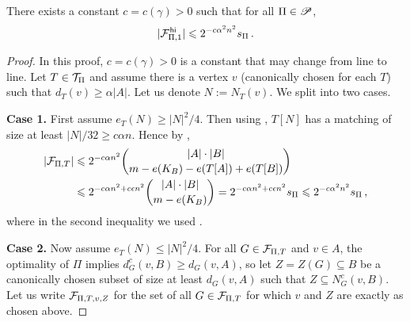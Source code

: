 \begin{lemma}\label{lemma:FPi1}
There exists a constant $c=c(\gamma)>0$ such that for all $\Pi\in{\mathscr P}$,
$$\lvert{\mathcal F}^{\hspace{0.2mm}\mathsf{hi}}_{\Pi,1}\rvert\leqslant2^{-c\alpha^2n^2}s_\Pi\,.$$
\end{lemma}
\begin{proof}
In this proof, $c=c(\gamma)>0$ is a constant that may change from line to line. Let $T\in{\mathcal T}_\Pi$ and assume there is a vertex $v$ (canonically chosen for each $T$) such that $d_T(v)\geq\alpha|A|$. Let us denote $N:=N_T(v)$. We split into two cases.

\smallskip
\noindent\textbf{Case 1.}
First assume $e_T(N)\geq|N|^2/4$. Then using \cite[Lemma~A.3]{perkins2025typical}, $T[N]$ has a matching of size at least $|N|/32\geq c\alpha n$. Hence by ,
\begin{align}
|{\mathcal F}_{\Pi,T}| &\leqslant 2^{-c\alpha n^2}\binom{|A|\cdot|B|}{m-e(K_B)-e(T[A])+e(T[B])} \nonumber\\
&\leqslant 2^{-c\alpha n^2+c\epsilon n^2}\binom{|A|\cdot|B|}{m-e(K_B)}
=2^{-c\alpha n^2+c\epsilon n^2}s_\Pi \leqslant2^{-c\alpha^2n^2}s_\Pi\,, \label{eqn:fhipi1-case1-bd}
\end{align}
where in the second inequality we used \cite[Lemma~A.1(ii)]{perkins2025typical}.
\smallskip

\noindent\textbf{Case 2.} Now assume $e_T(N)\leq|N|^2/4$. For all $G\in{\mathcal F}_{\Pi,T}$ and $v\in A$, the optimality of $\Pi$ implies $d_G^c(v,B)\geq d_G(v,A)$, so let $Z=Z(G)\subseteq B$ be a canonically chosen subset of size at least $d_G(v,A)$ such that $Z\subseteq N^c_G(v,B)$. Let us write ${\mathcal F}_{\Pi,T,v,Z}$ for the set of all $G\in{\mathcal F}_{\Pi,T}$ for which $v$ and $Z$ are exactly as chosen above.


\end{proof}

